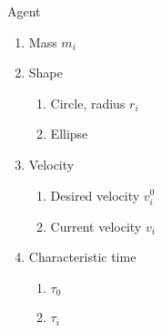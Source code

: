 Agent
\begin{enumerate}
\item 
Mass $ m_{i} $

\item 
Shape
\begin{enumerate}
\item 
Circle, radius $ r_{i} $

\item 
Ellipse
\end{enumerate}


\item 
Velocity
\begin{enumerate}
\item Desired velocity $ v_{i}^{0} $
\item Current velocity $ v_{i} $
\end{enumerate}

\item 
Characteristic time 
\begin{enumerate}
\item $ \tau_{0} $
\item $ \tau_{i} $
\end{enumerate}

\end{enumerate}

